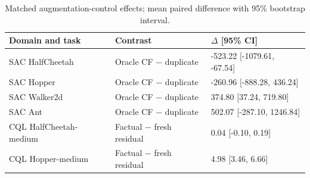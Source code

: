 \begin{table}[t]
\centering
\small
\caption{Matched augmentation-control effects; mean paired difference with 95\% bootstrap interval.}
\label{tab:matched_control_paired}
\begin{tabular}{lll}
\toprule
Domain and task & Contrast & $\Delta$ [95\% CI] \\
\midrule
SAC HalfCheetah & Oracle CF $-$ duplicate & -523.22 [-1079.61, -67.54] \\
SAC Hopper & Oracle CF $-$ duplicate & -260.96 [-888.28, 436.24] \\
SAC Walker2d & Oracle CF $-$ duplicate & 374.80 [37.24, 719.80] \\
SAC Ant & Oracle CF $-$ duplicate & 502.07 [-287.10, 1246.84] \\
CQL HalfCheetah-medium & Factual $-$ fresh residual & 0.04 [-0.10, 0.19] \\
CQL Hopper-medium & Factual $-$ fresh residual & 4.98 [3.46, 6.66] \\
\bottomrule
\end{tabular}
\end{table}

